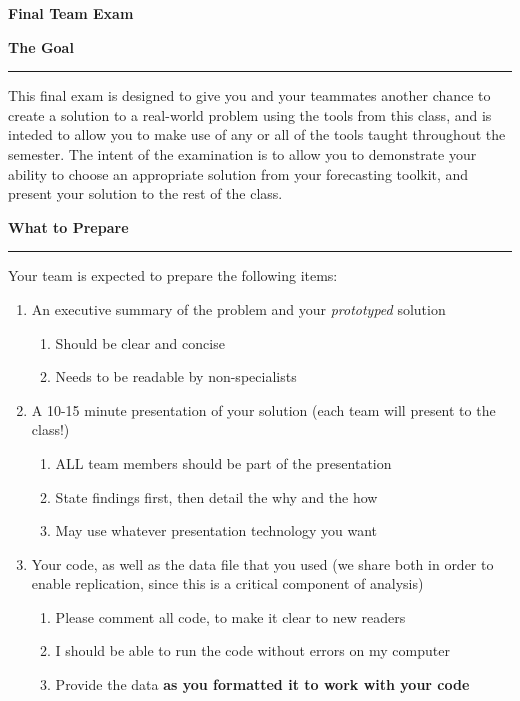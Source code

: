 \documentclass{article}
\begin{document}
\pagestyle{empty}

\begin{center} \Huge \textbf{Final Team Exam} \end{center}
\vspace*{1em}

\noindent \Large \textbf{The Goal}\\[-.8em]\hrule \vspace*{.5em}

\large \noindent This final exam is designed to give you and your teammates another chance to create a solution to a real-world problem using the tools from this class, and is inteded to allow you to make use of any or all of the tools taught throughout the semester. The intent of the examination is to allow you to demonstrate your ability to choose an appropriate solution from your forecasting toolkit, and present your solution to the rest of the class.

\vspace*{2em}
\noindent \Large \textbf{What to Prepare}\\[-.8em]\hrule \vspace*{.5em}
\large \noindent Your team is expected to prepare the following items:
\begin{enumerate}
\item An executive summary of the problem and your \emph{prototyped} solution
\begin{enumerate}
\item Should be clear and concise
\item Needs to be readable by non-specialists
\end{enumerate}
\item A 10-15 minute presentation of your solution (each team will present to the class!)
\begin{enumerate}
\item ALL team members should be part of the presentation
\item State findings first, then detail the why and the how
\item May use whatever presentation technology you want
\end{enumerate}
\item Your code, as well as the data file that you used (we share both in order to enable replication, since this is a critical component of analysis)
\begin{enumerate}
\item Please comment all code, to make it clear to new readers
\item I should be able to run the code without errors on my computer
\item Provide the data \textbf{as you formatted it to work with your code}
\end{enumerate}
\end{enumerate}
\end{document}
